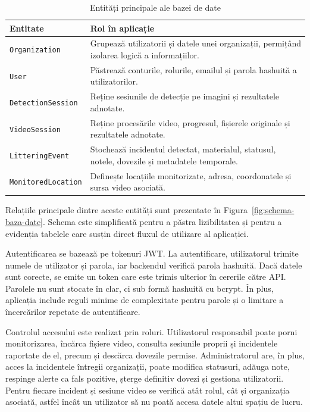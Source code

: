 \begin{table}[!htbp]
\centering
\begingroup
\small
{}
\renewcommand{\arraystretch}{1.16}
\setlength{\tabcolsep}{5pt}
\begin{tabular}{|>{\raggedright\arraybackslash}p{4.2cm}|>{\raggedright\arraybackslash}p{9cm}|}
\hline
\textbf{Entitate} & \textbf{Rol în aplicație} \\
\hline
\texttt{Organization} & Grupează utilizatorii și datele unei organizații, permițând izolarea logică a informațiilor. \\
\hline
\texttt{User} & Păstrează conturile, rolurile, emailul și parola hashuită a utilizatorilor. \\
\hline
\texttt{DetectionSession} & Reține sesiunile de detecție pe imagini și rezultatele adnotate. \\
\hline
\texttt{VideoSession} & Reține procesările video, progresul, fișierele originale și rezultatele adnotate. \\
\hline
\texttt{LitteringEvent} & Stochează incidentul detectat, materialul, statusul, notele, dovezile și metadatele temporale. \\
\hline
\texttt{MonitoredLocation} & Definește locațiile monitorizate, adresa, coordonatele și sursa video asociată. \\
\hline
\end{tabular}
\endgroup
\caption{Entități principale ale bazei de date}
\label{tab:entitati-db}
\end{table}

Relațiile principale dintre aceste entități sunt prezentate în Figura~\ref{fig:schema-baza-date}. Schema este simplificată pentru a păstra lizibilitatea și pentru a evidenția tabelele care susțin direct fluxul de utilizare al aplicației.



Autentificarea se bazează pe tokenuri JWT. La autentificare, utilizatorul trimite numele de utilizator și parola, iar backendul verifică parola hashuită. Dacă datele sunt corecte, se emite un token care este trimis ulterior în cererile către API. Parolele nu sunt stocate în clar, ci sub formă hashuită cu bcrypt. În plus, aplicația include reguli minime de complexitate pentru parole și o limitare a încercărilor repetate de autentificare.

Controlul accesului este realizat prin roluri. Utilizatorul responsabil poate porni monitorizarea, încărca fișiere video, consulta sesiunile proprii și incidentele raportate de el, precum și descărca dovezile permise. Administratorul are, în plus, acces la incidentele întregii organizații, poate modifica statusuri, adăuga note, respinge alerte ca fals pozitive, șterge definitiv dovezi și gestiona utilizatorii. Pentru fiecare incident și sesiune video se verifică atât rolul, cât și organizația asociată, astfel încât un utilizator să nu poată accesa datele altui spațiu de lucru.

